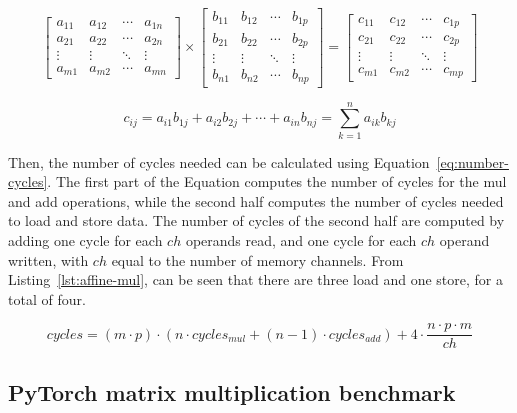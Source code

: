 \[ \begin{bmatrix}
     a_{11} & a_{12} & \cdots & a_{1n}\\
     a_{21} & a_{22} & \cdots & a_{2n}\\
     \vdots & \vdots & \ddots & \vdots\\
     a_{m1} & a_{m2} & \cdots & a_{mn}
 \end{bmatrix}
 \times
 \begin{bmatrix}
     b_{11} & b_{12} & \cdots & b_{1p}\\
     b_{21} & b_{22} & \cdots & b_{2p}\\
     \vdots & \vdots & \ddots & \vdots\\
     b_{n1} & b_{n2} & \cdots & b_{np}
 \end{bmatrix}
  =
 \begin{bmatrix}
     c_{11} & c_{12} & \cdots & c_{1p}\\
     c_{21} & c_{22} & \cdots & c_{2p}\\
     \vdots & \vdots & \ddots & \vdots\\
     c_{m1} & c_{m2} & \cdots & c_{mp}
 \end{bmatrix} \]

\begin{equation}
    \label{eq:matmul-element}
    c_{ij}= a_{i1} b_{1j} + a_{i2} b_{2j} +\cdots+ a_{in} b_{nj} = \sum_{k=1}^n a_{ik}b_{kj}
\end{equation}

Then, the number of cycles needed can be calculated using Equation~\ref{eq:number-cycles}.
The first part of the Equation computes the number of cycles for the mul and add operations, while the second half computes the number of cycles needed to load and store data.
The number of cycles of the second half are computed by adding one cycle for each $ch$ operands read, and one cycle for each $ch$ operand written, with $ch$ equal to the number of memory channels.
From Listing~\ref{lst:affine-mul}, can be seen that there are three load and one store, for a total of four.

\begin{equation}
    \label{eq:number-cycles}
    cycles = (m \cdot p) \cdot ( n\cdot cycles_{mul} + (n-1) \cdot cycles_{add}) + 4 \cdot \frac{n \cdot p \cdot m}{ch}
\end{equation}

\subsection{PyTorch matrix multiplication benchmark}
\label{subsec:pytorch-matmul-bench}%

